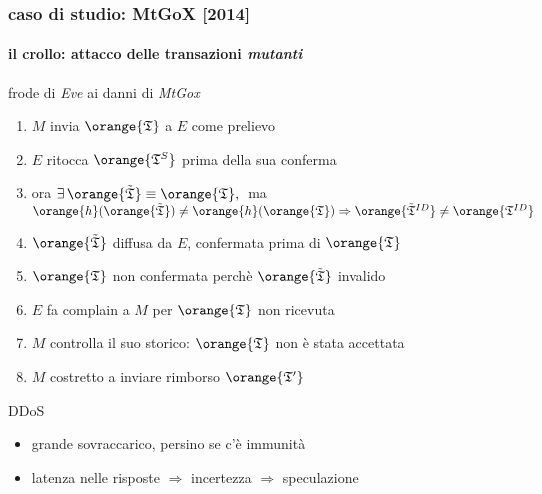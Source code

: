 \begin{frame}
\frametitle{caso di studio: MtGoX [2014]}
\framesubtitle{il crollo: attacco delle transazioni \textit{mutanti}}

	{\color{blue} frode} di \textit{Eve} ai danni di \textit{MtGox}
 	\begin{enumerate}
 	  	\item $M$ invia $\orange{\mathfrak{T}}$ a $E$ come prelievo
	 	\item $E$ ritocca $\orange{\mathfrak{T}^S}$ prima della sua conferma
	 	\item ora $\exists\,\orange{\tilde{\mathfrak{T}}}\equiv\orange{\mathfrak{T}},\;$ 
	 			ma $\orange{h}(\orange{\tilde{\mathfrak{T}}})\neq \orange{h}(\orange{\mathfrak{T}}) \Rightarrow 
	 			\orange{\tilde{\mathfrak{T}}^{ID}}\neq\orange{\mathfrak{T}^{ID}}$ 
	 	\item $\orange{\tilde{\mathfrak{T}}}$ diffusa da $E$, confermata prima di $\orange{\mathfrak{T}}$
	 	\item $\orange{\mathfrak{T}}$ non confermata perchè $\orange{\tilde{\mathfrak{T}}}$ invalido
	 	\item $E$ fa complain a $M$ per $\orange{\mathfrak{T}}$ non ricevuta
	 	\item $M$ controlla il suo storico: $\orange{\mathfrak{T}}$ non è stata accettata
	 	\item $M$ costretto a inviare rimborso $\orange{\mathfrak{T}^\prime}$
 	\end{enumerate}

	{\color{blue} DDoS}
	\begin{itemize}
	  	\item grande sovraccarico, persino se c'è immunità
	  	\item latenza nelle risposte $\Rightarrow$ incertezza $\Rightarrow$ speculazione
	\end{itemize}

\end{frame}